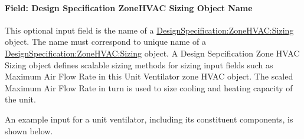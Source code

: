 \paragraph{Field: Design Specification ZoneHVAC Sizing Object Name}\label{field-design-specification-zonehvac-sizing-object-name-2}

This optional input field is the name of a \hyperref[designspecificationzonehvacsizing]{DesignSpecification:ZoneHVAC:Sizing} object. The name must correspond to unique name of a \hyperref[designspecificationzonehvacsizing]{DesignSpecification:ZoneHVAC:Sizing} object. A Design Sepcification Zone HVAC Sizing object defines scalable sizing methods for sizing input fields such as Maximum Air Flow Rate in this Unit Ventilator zone HVAC object. The scaled Maximum Air Flow Rate in turn is used to size cooling and heating capacity of the unit.

An example input for a unit ventilator, including its constituent components, is shown below.

